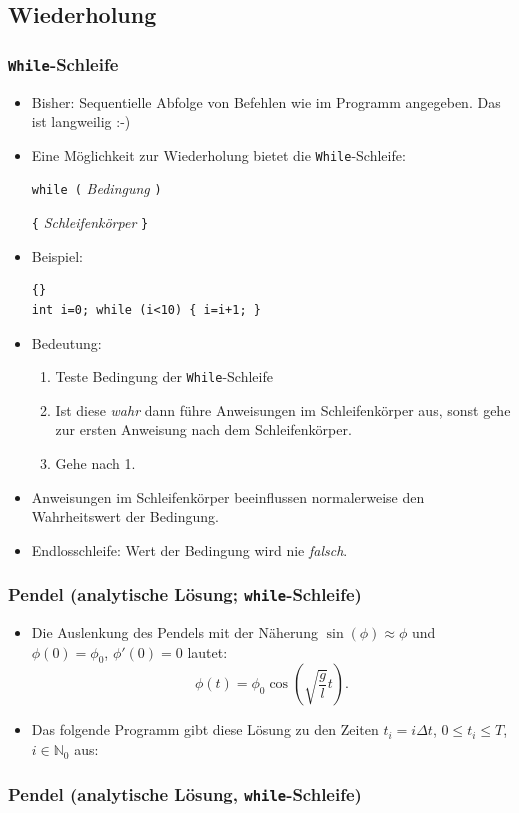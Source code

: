 \documentclass[ignorenonframetext,12pt]{beamer}
\theoremstyle{definition}
\theoremstyle{definition}
\begin{document}
\subsection{Wiederholung}

\begin{frame}[fragile]
\frametitle{\lstinline{While}-Schleife}
\begin{itemize}
\item Bisher: Sequentielle Abfolge von Befehlen wie im Programm
  angegeben. Das ist langweilig :-)
\item Eine Möglichkeit zur Wiederholung bietet die
  \lstinline{While}-Schleife:

\lstinline{while (} \textsl{Bedingung} \lstinline{)}

\lstinline!{! \textsl{Schleifenkörper} \lstinline!}!

\item Beispiel:
{\scriptsize\begin{lstlisting}{}
int i=0; while (i<10) { i=i+1; }
\end{lstlisting}}

\item Bedeutung:
\begin{enumerate}
\item Teste Bedingung der \lstinline{While}-Schleife
\item Ist diese \textsl{wahr} dann führe Anweisungen im
  Schleifenkörper aus, sonst gehe zur ersten Anweisung nach dem
  Schleifenkörper.
\item Gehe nach 1.
\end{enumerate}
\item Anweisungen im Schleifenkörper beeinflussen normalerweise den Wahrheitswert der
  Bedingung.
\item Endlosschleife: Wert der Bedingung wird nie \textsl{falsch}.
\end{itemize}
\end{frame}

\begin{frame}[fragile]
\frametitle{Pendel (analytische Lösung; \lstinline{while}-Schleife)}
\begin{itemize}
\item Die Auslenkung des Pendels mit der Näherung
  $\sin(\phi)\approx\phi$ und $\phi(0)=\phi_0$, $\phi'(0)=0$ lautet:
$$ \phi(t) = \phi_0 \cos\left(\sqrt{\frac{g}{l}} t\right) .$$
\item Das folgende Programm gibt diese Lösung zu den Zeiten $t_i=i
  \Delta t$, $0\leq t_i \leq T$, $i\in\mathbb{N}_0$ aus:
\end{itemize}
\end{frame}
\begin{frame}[fragile]
\frametitle<presentation>{Pendel (analytische Lösung, \lstinline{while}-Schleife)}

\end{frame}
\end{document}
